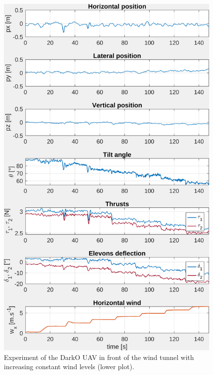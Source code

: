\begin{figure}[ht!]
    \centering
    \includegraphics[trim=0cm 0cm 0cm 0cm,clip,width=0.9\columnwidth]{figures/exp_systune_struct.png}
    \caption{Experiment of the DarkO UAV in front of the wind tunnel with increasing constant wind levels (lower plot).}
    \label{fig:ExpSytuneStruct}
\end{figure}

